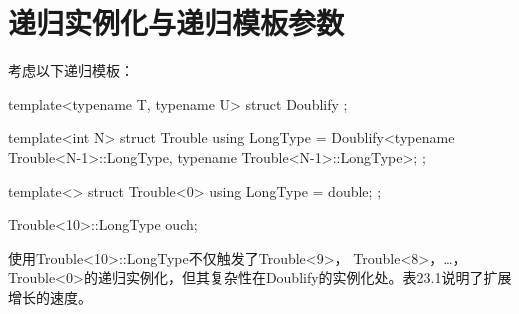 \section{递归实例化与递归模板参数}
考虑以下递归模板：

\begin{cpp}
template<typename T, typename U>
struct Doublify {
};

template<int N>
struct Trouble {
	using LongType = Doublify<typename Trouble<N-1>::LongType,
	typename Trouble<N-1>::LongType>;
};

template<>
struct Trouble<0> {
	using LongType = double;
};

Trouble<10>::LongType ouch;
\end{cpp}

使用Trouble<10>::LongType不仅触发了Trouble<9>， Trouble<8>，…，Trouble<0>的递归实例化，但其复杂性在Doublify的实例化处。表23.1说明了扩展增长的速度。

